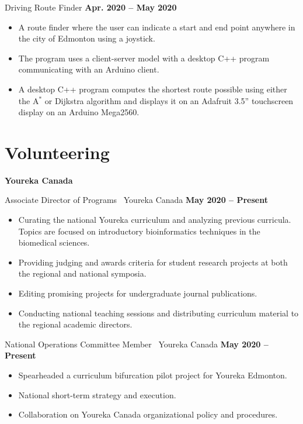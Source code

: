 \documentclass{article}
\begin{document}
    Driving Route Finder \hfill \textbf{Apr. 2020 -- May 2020}
    \begin{itemize}
        \item A route finder where the user can indicate a start and end point anywhere in the city of Edmonton using a joystick.
        \item The program uses a client-server model with a desktop C++ program communicating with an Arduino client.
        \item A desktop C++ program computes the shortest route possible using either the A$^*$ or Dijkstra algorithm and displays it on an Adafruit 3.5'' touchscreen display on an Arduino Mega2560.
    \end{itemize}


\section*{\textcolor{my_red}{Volunteering}}
    \textbf{Youreka Canada}

    Associate Director of Programs \textbar\ Youreka Canada \hfill \textbf{May 2020 -- Present}
    \begin{itemize}
        \item Curating the national Youreka curriculum and analyzing previous curricula. Topics are focused on introductory bioinformatics techniques in the biomedical sciences.
        \item Providing judging and awards criteria for student research projects at both the regional and national symposia.
        \item Editing promising projects for undergraduate journal publications.
        \item Conducting national teaching sessions and distributing curriculum material to the regional academic directors.
    \end{itemize}

    National Operations Committee Member \textbar\ Youreka Canada \hfill \textbf{May 2020 -- Present}
    \begin{itemize}
        \item Spearheaded a curriculum bifurcation pilot project for Youreka Edmonton.
        \item National short-term strategy and execution.
        \item Collaboration on Youreka Canada organizational policy and procedures.
    \end{itemize}
\end{document}

